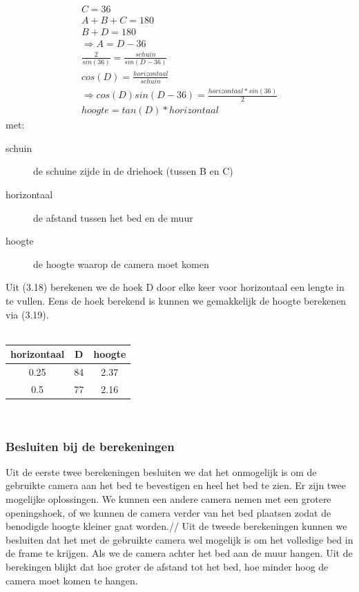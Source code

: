 \begin{gather}
C=36\\
A+B+C=180 \\
B+D=180 \\
\Rightarrow A=D-36\\
\frac{2}{sin(36)}=\frac{schuin}{sin(D-36)}\\
cos(D)=\frac{horizontaal}{schuin}\\
\Rightarrow cos(D)sin(D-36)=\frac{horizontaal*sin(36)}{2}\\
hoogte=tan(D)*horizontaal
\end{gather}
met:
\begin{description}
	\item[schuin] de schuine zijde in de driehoek (tussen B en C)
	\item[horizontaal] de afstand tussen het bed en de muur
	\item[hoogte] de hoogte waarop de camera moet komen
\end{description}
Uit (3.18) berekenen we de hoek D door elke keer voor horizontaal een lengte in te vullen. Eens de hoek berekend is kunnen we gemakkelijk de hoogte berekenen via (3.19). \\
\\
\begin{tabular}{|c|c|c|}
	\hline
	horizontaal & D & hoogte \\ \hline
	0.25 & 84 & 2.37 \\ \hline
	0.5 & 77 & 2.16 \\ 
	\hline
\end{tabular}
\\
\subsubsection{Besluiten bij de berekeningen}
Uit de eerste twee berekeningen besluiten we dat het onmogelijk is om de gebruikte camera aan het bed te bevestigen en heel het bed te zien. Er zijn twee mogelijke oplossingen. We kunnen een andere camera nemen met een grotere openingshoek, of we kunnen de camera verder van het bed plaatsen zodat de benodigde hoogte kleiner gaat worden.//
Uit de tweede berekeningen kunnen we besluiten dat het met de gebruikte camera wel mogelijk is om het volledige bed in de frame te krijgen. Als we de camera achter het bed aan de muur hangen. Uit de berekingen blijkt dat hoe groter de afstand tot het bed, hoe minder hoog de camera moet komen te hangen. 
